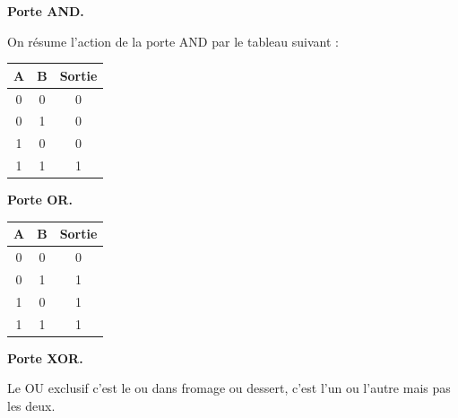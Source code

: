\documentclass[11pt,class=report,crop=false]{standalone}
\begin{document}
\textbf{Porte AND.}


On résume l'action de la porte AND par le tableau suivant :

\begin{center}
\begin{minipage}{0.45\textwidth}
\begin{center}
\begin{tabular}{|c|c|c|}
\hline
A & B & Sortie \\ \hline\hline
0 & 0 & 0 \\
0 & 1 & 0 \\
1 & 0 & 0 \\
1 & 1 & 1 \\ \hline
\end{tabular}
\end{center}
\end{minipage}
\begin{minipage}{0.45\textwidth}
\end{minipage}
\end{center}


\textbf{Porte OR.}


\begin{center}
\begin{minipage}{0.45\textwidth}
\begin{center}
\begin{tabular}{|c|c|c|}
\hline
A & B & Sortie \\ \hline\hline
0 & 0 & 0 \\
0 & 1 & 1 \\
1 & 0 & 1 \\
1 & 1 & 1 \\ \hline
\end{tabular}
\end{center}
\end{minipage}
\begin{minipage}{0.45\textwidth}
\end{minipage}
\end{center}


\textbf{Porte XOR.}

Le \og{}OU exclusif\fg{} c'est le \og{}ou\fg{} dans \og{}fromage ou dessert\fg{}, c'est l'un ou l'autre mais pas les deux.

\end{document}

